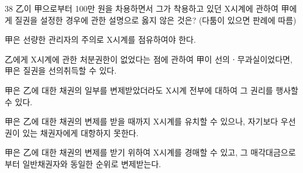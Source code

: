 \begin{question}{38}
乙이 甲으로부터 100만 원을 차용하면서 그가 착용하고 있던 X시계에 관하여 甲에게 질권을 설정한 경우에 관한 설명으로 옳지 않은 것은? (다툼이 있으면 판례에 따름)
\begin{choices}
  \item 甲은 선량한 관리자의 주의로 X시계를 점유하여야 한다.
  \item 乙에게 X시계에 관한 처분권한이 없었다는 점에 관하여 甲이 선의ㆍ무과실이었다면, 甲은 질권을 선의취득할 수 있다.
  \item 甲은 乙에 대한 채권의 일부를 변제받았더라도 X시계 전부에 대하여 그 권리를 행사할 수 있다.
  \item 甲은 乙에 대한 채권의 변제를 받을 때까지 X시계를 유치할 수 있으나, 자기보다 우선권이 있는 채권자에게 대항하지 못한다.
  \item 甲은 乙에 대한 채권의 변제를 받기 위하여 X시계를 경매할 수 있고, 그 매각대금으로부터 일반채권자와 동일한 순위로 변제받는다.
\end{choices}
\end{question}
